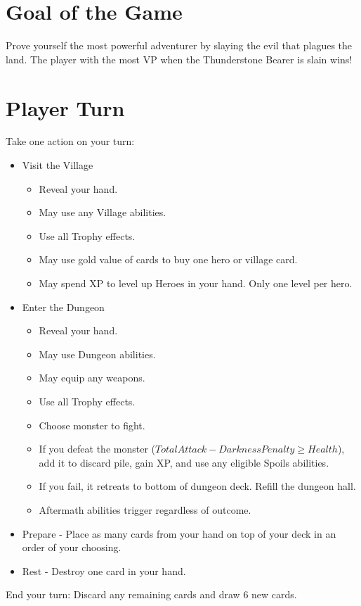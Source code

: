 \documentclass[12pt]{article}
\newenvironment{itemizeCustom}
{\begin{itemize}
  \setlength{\itemsep}{1pt}
  \setlength{\parskip}{0pt}
  \setlength{\parsep}{0pt}}
{\end{itemize}}
\begin{document}
\begin{multicols*}{2}
\section*{Goal of the Game}
Prove yourself the most powerful adventurer by slaying the evil that plagues the land. The player with the most VP when the Thunderstone Bearer is slain wins!

\section*{Player Turn}
Take one action on your turn:
\begin{itemizeCustom}
	\item Visit the Village 
		\begin{itemizeCustom}
			\item Reveal your hand. 
			\item May use any Village abilities. 
			\item Use all Trophy effects. 
			\item May use gold value of cards to buy one hero or village card. 
			\item May spend XP to level up Heroes in your hand. Only one level per hero.
		\end{itemizeCustom}
	\item Enter the Dungeon 
		\begin{itemizeCustom}
			\item Reveal your hand. 
			\item May use Dungeon abilities.
			\item May equip any weapons. 
			\item Use all Trophy effects. 
			\item Choose monster to fight.
			\item If you defeat the monster ($Total Attack - Darkness Penalty \ge Health$), add it to discard pile, gain XP, and use any eligible Spoils abilities. 
			\item If you fail, it retreats to bottom of dungeon deck. Refill the dungeon hall.
			\item Aftermath abilities trigger regardless of outcome.
		\end{itemizeCustom}
	\item Prepare - Place as many cards from your hand on top of your deck in an order of your choosing.
	\item Rest - Destroy one card in your hand.

\end{itemizeCustom}
End your turn: Discard any remaining cards and draw 6 new cards.


\end{multicols*}
\end{document}
